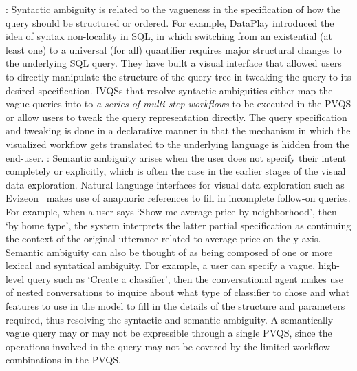 : Syntactic ambiguity is related to the vagueness in the specification of how the query should be structured or ordered. For example, DataPlay introduced the idea of syntax non-locality in SQL, in which switching from an existential (at least one) to a universal (for all) quantifier requires major structural changes to the underlying SQL query. They have built a visual interface that allowed users to directly manipulate the structure of the query tree in tweaking the query to its desired specification. IVQSs that resolve syntactic ambiguities either map the vague queries into to \textit{a series of multi-step workflows} to be executed in the PVQS or allow users to tweak the query representation directly. The query specification and tweaking is done in a declarative manner in that the mechanism in which the visualized workflow gets translated to the underlying language is hidden from the end-user. 
: Semantic ambiguity arises when the user does not specify their intent completely or explicitly, which is often the case in the earlier stages of the visual data exploration. Natural language interfaces for visual data exploration such as Evizeon~\cite{Hoque2017} makes use of anaphoric references to fill in incomplete follow-on queries. For example, when a user says `Show me average price by neighborhood', then `by home type', the system interprets the latter partial specification as continuing the context of the original utterance related to average price on the y-axis. Semantic ambiguity can also be thought of as being composed of one or more lexical and syntatical ambiguity. For example, a user can specify a vague, high-level query such as `Create a classifier', then the conversational agent makes use of nested conversations to inquire about what type of classifier to chose and what features to use in the model to fill in the details of the structure and parameters required, thus resolving the syntactic and semantic ambiguity. A semantically vague query may or may not be expressible through a single PVQS, since the operations involved in the query may not be covered by the limited workflow combinations in the PVQS. 


